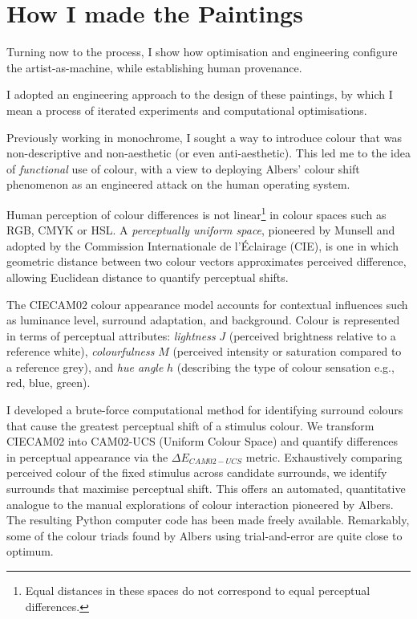 \documentclass[12pt]{article}
\begin{document}
\section{How I made the Paintings}\label{sec:process}
Turning now to the process, I show how optimisation and engineering
configure the artist-as-machine, while establishing human provenance.

I adopted an engineering approach to the design of these paintings, by
which I mean a process of iterated experiments and computational
optimisations.

Previously working in monochrome, I sought a way to introduce
colour that was non-descriptive and non-aesthetic (or even
anti-aesthetic). This led me to the idea of \emph{functional} use of
colour, with a view to deploying Albers' colour shift phenomenon
as an engineered attack on the human operating system.

Human perception of colour differences\autocite{MacAdam1942} is not
linear\footnote{Equal distances in these spaces do not correspond to
  equal perceptual differences.} in colour spaces such as RGB, CMYK or
HSL.\autocite{Luo2001CIECAM02} A \emph{perceptually uniform space},
pioneered by Munsell\autocite{Munsell1915} and adopted by the Commission
Internationale de l'\'{E}clairage
(CIE),\autocite{CIE1976,CIE1978Uniform,Luo2001CIEDE2000} is one in which
geometric distance between two colour vectors approximates perceived
difference, allowing Euclidean distance to quantify perceptual shifts.

The CIECAM02 colour appearance
model\autocite{Luo2001CIECAM02,CIE1592004} accounts for
contextual influences such as luminance level, surround adaptation,
and background. Colour is represented in terms of perceptual
attributes: \emph{lightness} $J$ (perceived brightness relative to a
reference white), \emph{colourfulness} $M$ (perceived intensity or
saturation compared to a reference grey), and \emph{hue angle} $h$
(describing the type of colour sensation e.g., red, blue, green).

I developed a brute-force computational method for identifying
surround colours that cause the greatest perceptual shift of a
stimulus colour. We transform CIECAM02 into CAM02-UCS (Uniform Colour
Space) and quantify differences in perceptual appearance via the
$\Delta E_{CAM02-UCS}$ metric. Exhaustively comparing perceived colour
of the fixed stimulus across candidate surrounds, we identify
surrounds that maximise perceptual shift. This offers an automated,
quantitative analogue to the manual explorations of colour interaction
pioneered by Albers.\autocite{albers} The resulting Python computer code
has been made freely
available.\autocite{grant2025colourshift} Remarkably, some of the colour
triads found by Albers using trial-and-error are quite close to
optimum.
\end{document}
